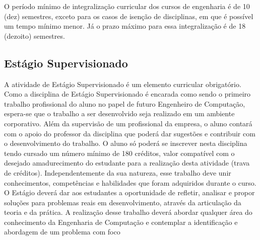 O período mínimo de integralização curricular dos cursos de engenharia é de 10 (dez) semestres, exceto para os casos de isenção de disciplinas, em que é possível um tempo mínimo menor. Já o prazo máximo para essa integralização é de 18 (dezoito) semestres.


\subsection{Estágio Supervisionado}

A atividade de Estágio Supervisionado é um elemento curricular obrigatório. 
Como a disciplina de Estágio Supervisionado é encarada como sendo o primeiro trabalho profissional do aluno no papel de futuro Engenheiro de Computação, espera-se que o trabalho a ser desenvolvido seja realizado em um ambiente corporativo. Além da supervisão de um profissional da empresa, o aluno contará com o apoio do professor da disciplina que poderá dar sugestões e contribuir com o desenvolvimento do trabalho. O aluno só poderá se inscrever nesta disciplina tendo cursado um número mínimo de 180 créditos, valor compatível com o desejado amadurecimento do estudante para a realização desta atividade (trava de créditos).
Independentemente da sua natureza, esse trabalho deve unir conhecimentos, competências e habilidades que foram adquiridos durante o curso. O Estágio deverá dar aos estudantes a oportunidade de refletir, analisar e propor soluções para problemas reais em desenvolvimento, através da articulação da teoria e da prática. A realização desse trabalho deverá abordar qualquer área do conhecimento da Engenharia de Computação e contemplar a identificação e abordagem de um problema com foco
